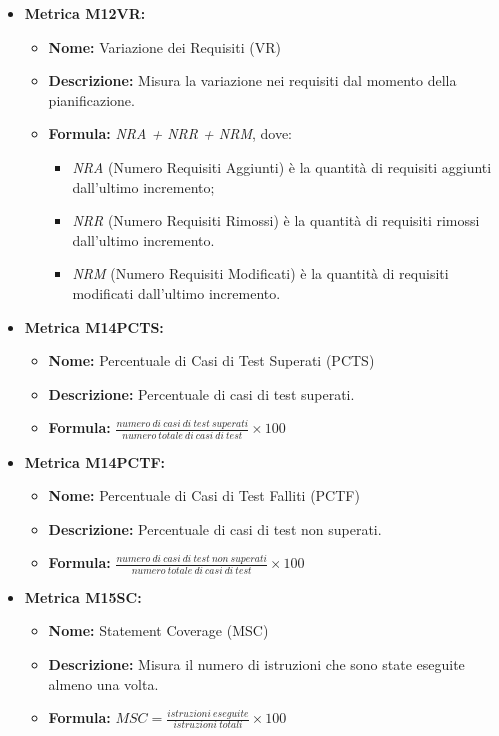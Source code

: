 \begin{itemize}
    \item \textbf{Metrica M12VR:}
          \begin{itemize}
              \item \textbf{Nome:} Variazione dei Requisiti (VR)
              \item \textbf{Descrizione:} Misura la variazione nei requisiti dal momento della pianificazione.
              \item \textbf{Formula:} \textit{NRA + NRR + NRM}, dove:\begin{itemize}
                \item \textit{NRA} (Numero Requisiti Aggiunti) è la quantità di requisiti aggiunti dall'ultimo incremento;
                \item \textit{NRR} (Numero Requisiti Rimossi) è la quantità di requisiti rimossi dall'ultimo incremento.
                \item \textit{NRM} (Numero Requisiti Modificati) è la quantità di requisiti modificati dall'ultimo incremento.
              \end{itemize}
          \end{itemize}
    
    \item \textbf{Metrica M14PCTS:}
          \begin{itemize}
           \item \textbf{Nome:} Percentuale di Casi di Test Superati (PCTS)
           \item \textbf{Descrizione:} Percentuale di casi di test superati.
           \item \textbf{Formula:} $\frac{numero \ di \ casi \ di \ test \ superati}{numero \ totale \ di \ casi \ di \ test}\times 100$
          \end{itemize}

    \item \textbf{Metrica M14PCTF:}
          \begin{itemize}
           \item \textbf{Nome:} Percentuale di Casi di Test Falliti (PCTF)
           \item \textbf{Descrizione:} Percentuale di casi di test non superati.
           \item \textbf{Formula:} $\frac{numero \ di \ casi \ di \ test \ non \ superati}{numero \ totale \ di \ casi \ di \ test}\times 100$
          \end{itemize}

          \item \textbf{Metrica M15SC:}
          \begin{itemize}
              \item \textbf{Nome:} Statement Coverage (MSC)
              \item \textbf{Descrizione:} Misura il numero di istruzioni che sono state eseguite almeno una volta.
              \item \textbf{Formula:} $MSC = \frac{istruzioni \ eseguite}{istruzioni \ totali} \times 100$
          \end{itemize}


\end{itemize}
